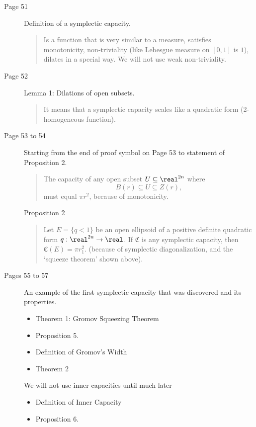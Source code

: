 \documentclass[../main-v2-manifolds.tex]{subfiles}
\providecommand{\frakc}{\mathfrak{C}}
\begin{document}
\begin{description}
    \item[Page 51]
	Definition of a symplectic capacity.
 \begin{quote}
     Is a function that is very similar to a measure, satisfies  monotonicity, non-triviality (like Lebesgue measure on $[0,1]$ is $1$), dilates in a special way. We will not use weak non-triviality.
 \end{quote}
\item[Page 52]
	Lemma 1: Dilations of open subsets. 
    \begin{quote}
    It means that a symplectic capacity scales like a quadratic form (2-homogeneous function).    
    \end{quote}
\item[Page 53 to 54]
	Starting from the end of proof symbol on Page 53 to statement of Proposition 2.
    \begin{quote}
        The capacity of any open subset $U\subseteq\realtn$ where
        \[
            B(r)\subseteq U\subseteq Z(r),
        \]
        must equal $\pi r^2$, because of monotonicity.
    \end{quote}
	
	Proposition 2
 \begin{quote}
     Let $E = \{q<1\}$ be an open ellipsoid of a positive definite quadratic form $q: \realtn\to\real$. If $\frakc$ is any symplectic capacity, then $\frakc(E) = \pi r_1^2$. (because of symplectic diagonalization, and the ‘squeeze theorem’ shown above).
 \end{quote}
	
\item[Pages 55 to 57]
An example of the first symplectic capacity that was discovered and its properties.
\begin{itemize}
    \item Theorem 1: Gromov Squeezing Theorem
    \item Proposition 5.
    \item Definition of Gromov’s Width
    \item Theorem 2
\end{itemize}
We will not use inner capacities until much later
\begin{itemize}
    \item Definition of Inner Capacity
    \item Proposition 6.
\end{itemize}
\end{description}
\ifSubfilesClassLoaded{%
}{}
\end{document}
